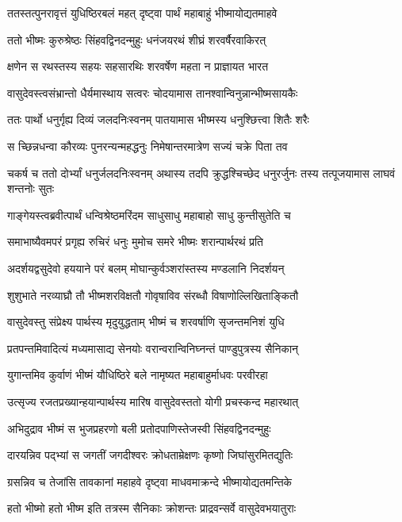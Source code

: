 \twolineshloka
{ततस्तत्पुनरावृत्तं युधिष्ठिरबलं महत्}
{दृष्ट्वा पार्थं महाबाहुं भीष्मायोद्यतमाहवे}


\twolineshloka
{ततो भीष्मः कुरुश्रेष्ठः सिंहवद्विनदन्मुहुः}
{धनंजयरथं शीघ्रं शरवर्षैरवाकिरत्}


\twolineshloka
{क्षणेन स रथस्तस्य सहयः सहसारथिः}
{शरवर्षेण महता न प्राज्ञायत भारत}


\twolineshloka
{वासुदेवस्त्वसंभ्रान्तो धैर्यमास्थाय सत्वरः}
{चोदयामास तानश्वान्विनुन्नान्भीष्मसायकैः}


\twolineshloka
{ततः पार्थो धनुर्गृह्य दिव्यं जलदनिःस्वनम्}
{पातयामास भीष्मस्य धनुश्छित्त्वा शितैः शरैः}


\twolineshloka
{स च्छिन्नधन्वा कौरव्यः पुनरन्यन्महद्धनुः}
{निमेषान्तरमात्रेण सज्यं चक्रे पिता तव}


\threelineshloka
{चकर्ष च ततो दोर्भ्यां धनुर्जलदनिःस्वनम्}
{अथास्य तदपि क्रुद्धश्चिच्छेद धनुरर्जुनः}
{तस्य तत्पूजयामास लाघवं शन्तनोः सुतः}


\twolineshloka
{गाङ्गेयस्त्वब्रवीत्पार्थं धन्विश्रेष्ठमरिंदम}
{साधुसाधु महाबाहो साधु कुन्तीसुतेति च}


\twolineshloka
{समाभाष्यैवमपरं प्रगृह्य रुचिरं धनुः}
{मुमोच समरे भीष्मः शरान्पार्थरथं प्रति}


\twolineshloka
{अदर्शयद्वसुदेवो हययाने परं बलम्}
{मोघान्कुर्वञ्शरांस्तस्य मण्डलानि निदर्शयन्}


\twolineshloka
{शुशुभाते नरव्याघ्रौ तौ भीष्मशरविक्षतौ}
{गोवृषाविव संरब्धौ विषाणोल्लिखिताङ्कितौ}


\twolineshloka
{वासुदेवस्तु संप्रेक्ष्य पार्थस्य मृदुयुद्धताम्}
{भीष्मं च शरवर्षाणि सृजन्तमनिशं युधि}


\twolineshloka
{प्रतपन्तमिवादित्यं मध्यमासाद्य सेनयोः}
{वरान्वरान्विनिघ्नन्तं पाण्डुपुत्रस्य सैनिकान्}


\twolineshloka
{युगान्तमिव कुर्वाणं भीष्मं यौधिष्ठिरे बले}
{नामृष्यत महाबाहुर्माधवः परवीरहा}


\twolineshloka
{उत्सृज्य रजतप्रख्यान्हयान्पार्थस्य मारिष}
{वासुदेवस्ततो योगी प्रचस्कन्द महारथात्}


\twolineshloka
{अभिदुद्राव भीष्मं स भुजप्रहरणो बली}
{प्रतोदपाणिस्तेजस्वी सिंहवद्विनदन्मुहुः}


\twolineshloka
{दारयन्निव पद्भ्यां स जगतीं जगदीश्वरः}
{क्रोधताम्रेक्षणः कृष्णो जिघांसुरमितद्युतिः}


\twolineshloka
{ग्रसन्निव च तेजांसि तावकानां महाहवे}
{दृष्ट्वा माधवमाक्रन्दे भीष्मायोद्यतमन्तिके}


\twolineshloka
{हतो भीष्मो हतो भीष्म इति तत्रस्म सैनिकाः}
{क्रोशन्तः प्राद्रवन्सर्वे वासुदेवभयातुराः}


